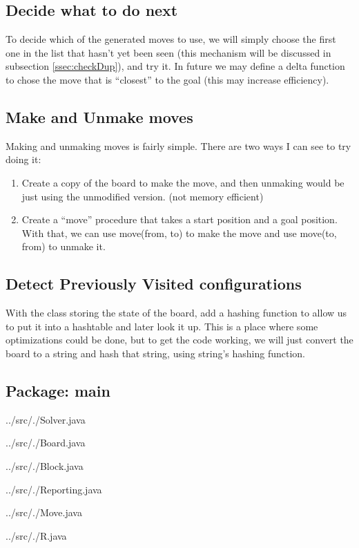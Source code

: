 \documentclass[a4paper]{article}
\newcommand{\sourceRoot}{../src/}
\newcommand{\myPackage}{}
\newcommand{\myJPackage}{}
\newcommand{\sourcePackage}[2]{  \subsection*{Package: #2}
                                 \renewcommand{\myPackage}{#1}
                                 \renewcommand{\myJPackage}{#2}}
\newcommand{\sourceClass}[1]{    
                                 {\sourceRoot\myPackage/#1}}
\begin{document}
\subsection{Decide what to do next}
To decide which of the generated moves to use, we will simply choose the first 
one in the list that hasn't yet been seen (this mechanism will be discussed in 
subsection \ref{ssec:checkDup}), and try it. In future we may define a delta 
function to chose the move that is ``closest'' to the goal (this may increase 
efficiency).

\subsection{Make and Unmake moves}
Making and unmaking moves is fairly simple. There are two ways I can see to try 
doing it: 
\begin{enumerate}
\item Create a copy of the board to make the move, and then unmaking would be 
      just using the unmodified version.  (not memory efficient)
\item Create a ``move'' procedure that takes a start position and a goal 
      position. With that, we can use move(from, to) to make the move and use 
      move(to, from) to unmake it. 
\end{enumerate}

\subsection{Detect Previously Visited configurations}
With the class storing the state of the board, add a hashing function to allow 
us to put it into a hashtable and later look it up. This is a place where some 
optimizations could be done, but to get the code working, we will just convert 
the board to a string and hash that string, using string's hashing function. 
\label{ssec:checkDup}


\sourcePackage{.}{main}
\sourceClass{Solver.java}
\sourceClass{Board.java}
\sourceClass{Block.java}
\sourceClass{Reporting.java}
\sourceClass{Move.java}
\sourceClass{R.java}
\end{document}

